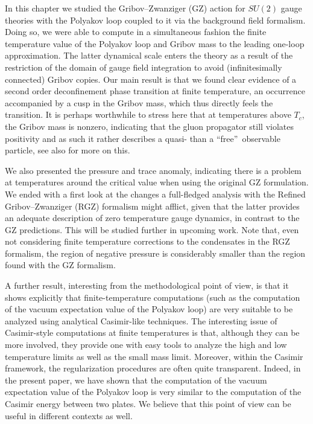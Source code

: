 In this chapter we studied the Gribov--Zwanziger (GZ) action for $SU(2)$ gauge theories with
the Polyakov loop coupled to it via the background field formalism. Doing
so, we were able to compute in a simultaneous fashion the finite temperature
value of the Polyakov loop and Gribov mass to the leading one-loop
approximation. The latter dynamical scale enters the theory as a result of
the restriction of the domain of gauge field integration to avoid
(infinitesimally connected) Gribov copies. Our main result is that we found
clear evidence of a second order deconfinement phase transition at finite
temperature, an occurrence accompanied by a cusp in the Gribov mass, which
thus directly feels the transition. It is perhaps worthwhile to stress here
that at temperatures above $T_{c}$, the Gribov mass is nonzero, indicating
that the gluon propagator still violates positivity and as such it rather
describes a quasi- than a \textquotedblleft free\textquotedblright\
observable particle, see also \cite{Maas:2011se,Haas:2013hpa} for more on this.

We also presented the pressure and trace anomaly, indicating there is a
problem at temperatures around the critical value when using the original GZ
formulation. We ended with a first look at the changes a full-fledged
analysis with the Refined Gribov--Zwanziger (RGZ) formalism might afflict, given
that the latter provides an adequate description of zero temperature gauge
dynamics, in contrast to the GZ predictions. This will be studied further in
upcoming work. Note that, even not considering finite temperature corrections to the
condensates in the RGZ formalism, the region of negative pressure is considerably smaller than
the region found with the GZ formalism.

A further result, interesting from the methodological point of view, is that it shows
explicitly that finite-temperature computations (such as the computation of the vacuum
expectation value of the Polyakov loop) are very suitable to be analyzed using analytical
Casimir-like techniques. The interesting issue of Casimir-style computations at finite
temperatures is that, although they can be more involved, they provide one
with easy tools to analyze the high and low temperature limits as well as
the small mass limit. Moreover, within the Casimir framework, the
regularization procedures are often quite transparent. Indeed, in the
present paper, we have shown that the computation of the vacuum expectation value of the Polyakov
loop is very similar to the computation of the Casimir energy between two
plates. We believe that this point of view can be useful in different
contexts as well.


